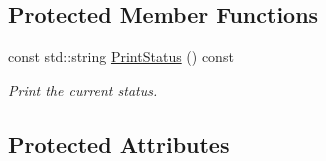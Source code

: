\subsection*{Protected Member Functions}
\begin{DoxyCompactItemize}
\item 
const std\+::string \hyperlink{classMemoryInitializationWriterBase_aff08e4a2fa61dbb92047774c680db0b7}{Print\+Status} () const
\begin{DoxyCompactList}\small\item\em Print the current status. \end{DoxyCompactList}\end{DoxyCompactItemize}
\subsection*{Protected Attributes}
